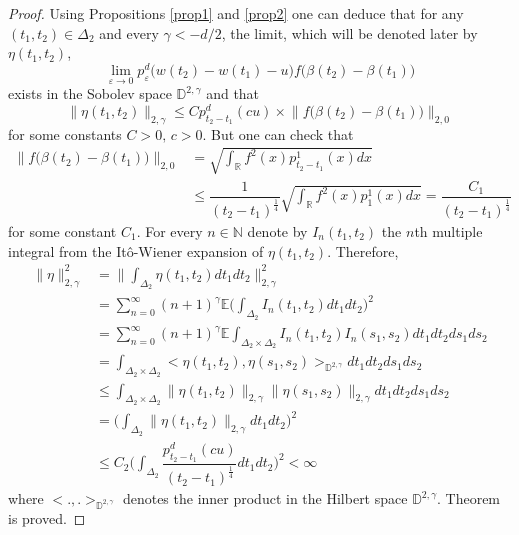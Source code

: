\documentclass[]{interact}
\newcommand{\E}{{\mathbb{E}}}
\newcommand{\R}{{\mathbb{R}}}
\newcommand{\D}{{\mathbb{D}}}
\newcommand{\1}{\mathbf{1}}
\newcommand{\N}{{\mathbb N}}
\theoremstyle{plain}%
\theoremstyle{definition}
\theoremstyle{remark}
\begin{document}
\begin{proof}
Using Propositions \ref{prop1} and \ref{prop2} one can deduce that for any $(t_1,t_2)\in \Delta_2$ and every $\gamma <-d/2 $, the limit, which will be denoted later by $\eta(t_1,t_2)$,
$$ \lim_{\varepsilon \to 0} p^d_{\varepsilon}\big( w(t_{2})-w(t_1)-u \big) f\big( \beta(t_2)-\beta(t_1)\big )  $$
exists in the Sobolev space $\D^{2,\gamma}$ and that 
$$ \big \| \eta (t_1,t_2)  \big\| _{2,\gamma}  \leqslant C p^d_{t_{2}-t_1}( cu) \times \big \| f\big( \beta(t_2)-\beta(t_1)\big )  \big\| _{2,0}  $$
for some constants $C>0,\, c>0$. But one can check that 
\begin{align*}  
\big \| f\big( \beta(t_2)-\beta(t_1)\big )  \big\| _{2,0} 
&=\sqrt{ \int_{\R} f^2(x)p_{t_2-t_1}^1(x)dx }\\
& \leqslant \dfrac{1}{(t_2-t_1) ^{ \frac{1}{4} } }  \sqrt{ \int_{\R} f^2(x)p_{1}^1(x)dx } =\dfrac{C_1}{(t_2-t_1) ^{ \frac{1}{4} } }    
\end{align*}
for some constant $C_1$. For every $n\in \N$ denote by $I_n(t_1,t_2)$ the $n$th multiple integral from the
It\^{o}-Wiener expansion of $\eta(t_1, t_2)$. Therefore,\\
\begin{align*}
\big \| \eta \big\| _{2,\gamma} ^2
&=\Big \| \int_{\Delta_2}  \eta (t_1,t_2)dt_1dt_2\Big\| _{2,\gamma} ^2\\
&= \sum_{n= 0}^{\infty} (n+1)^{\gamma }\E  \Big( \int_{\Delta_2}  I_n(t_1,t_2) dt_1 dt_2 \Big)^2    \\
&= \sum_{n= 0}^{\infty} (n+1)^{\gamma }\E  \int_{\Delta_2 \times \Delta_2}  I_n (t_1,t_2)I_n (s_1,s_2) dt_1 dt_2 ds_1ds_2    \\
&=  \int_{\Delta_2 \times \Delta_2} \Big< \eta (t_1,t_2),\eta (s_1,s_2) \Big>_{\D^{2,\gamma}}  dt_1 dt_2 ds_1ds_2     \\
&\leqslant  \int_{\Delta_2 \times \Delta_2} \big \| \eta (t_1,t_2)  \big\| _{2,\gamma} \big \| \eta (s_1,s_2)  \big\| _{2,\gamma} dt_1 dt_2 ds_1ds_2     \\
&=  \Big( \int_{\Delta_2 } \big \| \eta (t_1,t_2)  \big\| _{2,\gamma}   dt_1dt_2  \Big)^2    \\
&\leqslant C_2  \Big( \int_{\Delta_2 }  \dfrac{p^d_{t_{2}-t_1}( cu)  }{(t_2-t_1) ^{ \frac{1}{4} } }  dt_1dt_2   \Big)^2   <\infty
\end{align*}
where $\big< .,. \big>_{\D^{2,\gamma}}$ denotes the inner product in the Hilbert space $\D^{2,\gamma}$.
Theorem is proved.
\end{proof}
\end{document}
